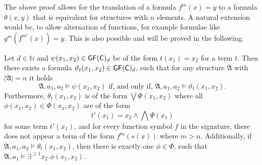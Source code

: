 The above proof allows for the translation of a formula $f^m(x)=y$ to a formula $\theta(x,y)$ that is equivalent for structures with $n$ elements.
A natural extension would be, to allow alternation of functions, for example formulae like $g^m(f^{m'}(x))=y$.
This is also possible and will be proved in the following.

\begin{lemma}
	Let $d\in\mathbb N$ and $\psi(x_1,x_2)\in \mathsf{GF}(\mathsf{C})_d$ be of the form $t(x_1)=x_2$ for a term $t$.
	Then there exists a formula $\vartheta_{t}(x_1,x_2)\in\mathsf{GF}(\mathsf{C})_d$, such that for any structure $\mathfrak A$ with $\vert \mathfrak A \vert = n$ it holds
	$$\mathfrak A,a_1,a_2 \models \psi(x_1,x_2) \text{ if, and only if, } \mathfrak A,a_1,a_2 \models \vartheta_{t}(x_1,x_2).$$ 
	Furthermore, $\theta_{t}(x_1,x_2)$ is of the form $\bigvee \Phi(x_1,x_2)$ where all $\phi(x_1,x_2)\in\Phi(x_1,x_2)$ are of the form
	$$t'(x_1)=x_2 \land \bigwedge \Psi(x_1)$$ 
	for some term $t'(x_1)$, and for every function symbol $f$ in the signature, there does not appear a term of the form $f^m(s(x))$ where $m > n$.
	Additionally, if $\mathfrak A,a_1,a_2\models \theta_{t}(x_1,x_2)$, then there is exactly one $\phi\in\Phi$, such that $\mathfrak A,a_1\models \exists^{\geq 1}x_2.\phi(x_1,x_2)$.
	\label{TranslationOfArbTerms}
\end{lemma}
